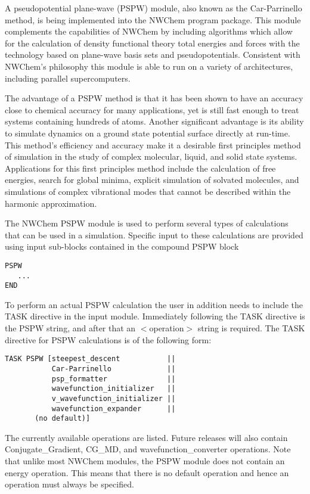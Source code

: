 \label{sec:pspw}

A pseudopotential plane-wave (PSPW) module, also known as the Car-Parrinello 
method, is being implemented into the NWChem program package.  This module  
complements the capabilities of NWChem by including algorithms which allow 
for the calculation of density functional theory total energies and forces 
with the technology based on plane-wave basis sets and pseudopotentials.  
Consistent with NWChem's philosophy this module is able to run on a variety 
of architectures, including parallel supercomputers.

The advantage of a PSPW method is that it has been shown to have an accuracy 
close to chemical accuracy for many applications, yet is still fast enough 
to treat systems containing hundreds of atoms.  Another significant advantage 
is its ability to simulate dynamics on a ground state potential surface 
directly at run-time.  This method's efficiency and accuracy make it a 
desirable first principles method of simulation in the study of complex 
molecular, liquid, and solid state systems.  Applications for this first 
principles method include the calculation of free energies, search for 
global minima, explicit simulation of solvated molecules, and simulations 
of complex vibrational modes that cannot be described within the harmonic 
approximation.

The NWChem PSPW module is used to perform several types of calculations that
can be used in a simulation.  Specific input to these calculations are
provided using input sub-blocks contained in the compound PSPW  block
\begin{verbatim}
PSPW
   ...
END
\end{verbatim}
To perform an actual PSPW calculation the user in addition needs to include
the TASK directive in the input module.  Immediately following the 
TASK directive is the PSPW string, and after that an $<$operation$>$ string 
is required.  The TASK directive for PSPW calculations is of the following
form:
\begin{verbatim}
TASK PSPW [steepest_descent           ||
           Car-Parrinello             ||
           psp_formatter              ||
           wavefunction_initializer   ||
           v_wavefunction_initializer ||
           wavefunction_expander      ||
	   (no default)]
\end{verbatim}
The currently available operations are listed.  Future releases will
also contain Conjugate\_Gradient, CG\_MD, and wavefunction\_converter
operations.  Note that unlike most NWChem modules, the PSPW module does 
not contain an energy operation.  This means that there is no default
operation and hence an operation must always be specified.

